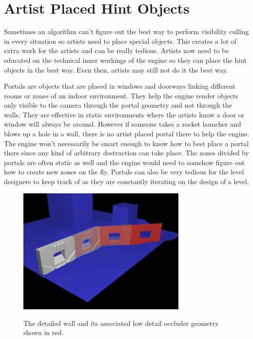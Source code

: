 \documentclass[12pt]{ucthesis}
\newcommand{\captionfonts}{\small\bf\ssp}
\begin{document}
\section{Artist Placed Hint Objects}
\label{artist-placed-hint-objects}

Sometimes an algorithm can't figure out the best way to perform visibility culling in every situation so artists need to place special objects.
This creates a lot of extra work for the artists and can be really tedious.
Artists now need to be educated on the technical inner workings of the engine so they can place the hint objects in the best way.
Even then, artists may still not do it the best way.

Portals are objects that are placed in windows and doorways linking different rooms or zones of an indoor environment.\cite{Vis-Computations-Densely-Occluded, Doom3-source-review, Portal-culling}
They help the engine render objects only visible to the camera through the portal geometry and not through the walls.
They are effective in static environments where the artists know a door or window will always be around.
However if someone takes a rocket launcher and blows up a hole in a wall, there is no artist placed portal there to help the engine.
The engine won't necessarily be smart enough to know how to best place a portal there since any kind of arbitrary destruction can take place.
The zones divided by portals are often static as well and the engine would need to somehow figure out how to create new zones on the fly.
Portals can also be very tedious for the level designers to keep track of as they are constantly iterating on the design of a level.

\begin{figure}
\begin{center}
\includegraphics[width=0.75\textwidth]{Images/OccluderGeomFig.jpg}
\captionfonts
\caption[Occluder Geometry]{The detailed wall and its associated low detail occluder geometry shown in red.}
\label{fig:occluder-geometry}
\end{center}
\end{figure}
\end{document}
